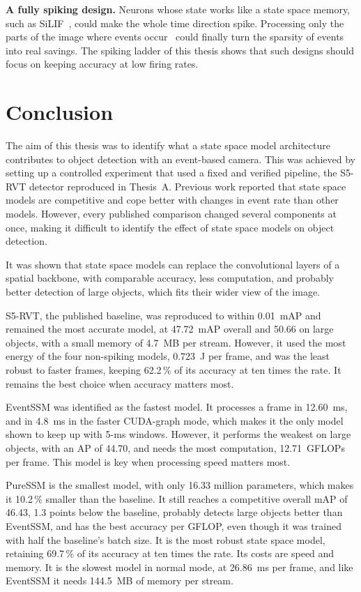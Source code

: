 \documentclass[11pt, a4paper]{report}
\begin{document}
\textbf{A fully spiking design.} Neurons whose state works like a state space memory, such as
SiLIF~\cite{fabre2025silif}, could make the whole time direction spike. Processing only the parts of the
image where events occur~\cite{yang2025smamba} could finally turn the sparsity of events into real savings.
The spiking ladder of this thesis shows that such designs should focus on keeping accuracy at low firing rates.

\chapter{Conclusion}
\label{ch:conclusion}
The aim of this thesis was to identify what a state space model architecture contributes to object detection
with an event-based camera. This was achieved by setting up a controlled experiment that used a fixed and
verified pipeline, the S5-RVT detector reproduced in Thesis~A. Previous work reported that state space models
are competitive and cope better with changes in event rate than other models. However, every published
comparison changed several components at once, making it difficult to identify the effect of state space
models on object detection.

It was shown that state space models can replace the convolutional layers of a spatial backbone, with
comparable accuracy, less computation, and probably better detection of large objects, which fits their wider
view of the image.

S5-RVT, the published baseline, was reproduced to within 0.01~mAP and remained the most accurate model, at 47.72~mAP
overall and 50.66 on large objects, with a small memory of 4.7~MB per stream. However, it used the most energy
of the four non-spiking models, 0.723~J per frame, and was the least robust to faster frames, keeping
62.2\,\% of its accuracy at ten times the rate. It remains the best choice when accuracy matters most.

EventSSM was identified as the fastest model. It processes a frame in 12.60~ms, and in 4.8~ms in the faster
CUDA-graph mode, which makes it the only model shown to keep up with 5-ms windows. However, it performs the
weakest on large objects, with an AP of 44.70, and needs the most computation, 12.71~GFLOPs per frame. This
model is key when processing speed matters most.

PureSSM is the smallest model, with only 16.33 million parameters, which makes it 10.2\,\% smaller than the
baseline. It still reaches a competitive overall mAP of 46.43, 1.3 points below the baseline, probably detects
large objects better than EventSSM, and has the best accuracy per GFLOP, even though it was trained with half
the baseline's batch size. It is the most robust state space model, retaining 69.7\,\% of its accuracy at ten
times the rate. Its costs are speed and memory. It is the slowest model in normal mode, at 26.86~ms per frame,
and like EventSSM it needs 144.5~MB of memory per stream.
\end{document}
